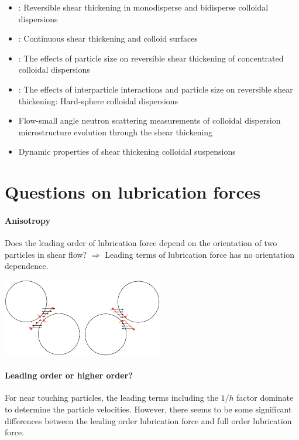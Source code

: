 \documentclass[12pt]{article}
\begin{document}
\begin{itemize}
 \item \citet{Bender_1996}:
Reversible shear thickening in monodisperse and bidisperse colloidal dispersions
 \item \citet{Melrose_1996}:
Continuous shear thickening and colloid surfaces
 \item \citet{Maranzano_2001}:
The effects of particle size on reversible shear thickening of concentrated colloidal dispersions
 \item \citet{Maranzano_2001a}:
The effects of interparticle interactions and particle size 
on reversible shear thickening: Hard-sphere colloidal dispersions
 \item \citet{Maranzano_2002}
Flow-small angle neutron scattering measurements 
of colloidal dispersion microstructure evolution through the shear thickening 
 \item \cite{Lee_2003}
Dynamic properties of shear thickening colloidal suspensions

 \end{itemize}

\section{Questions on lubrication forces}

\paragraph{Anisotropy}
Does the leading order of lubrication force depend 
on the orientation of two particles in shear flow?
%
$\Longrightarrow$ 
Leading terms of lubrication force
has no orientation dependence.
%
\begin{center}
\includegraphics[width=7cm]{Lub_orientation_dependence.pdf} 
\end{center}

\paragraph{Leading order or higher order?}

For near touching particles,
the leading terms including the $1/h$ factor
dominate to determine the particle velocities.
%
However, there seems
to be some significant differences
between the leading order lubrication force 
and full order lubrication force.
\end{document}
